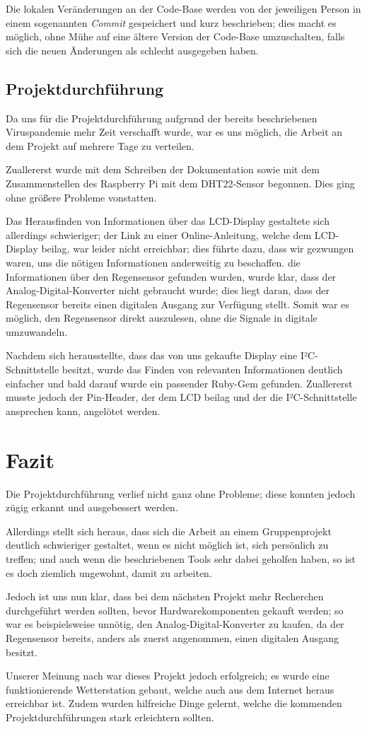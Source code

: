 \documentclass[a4paper,12pt]{article}
\begin{document}
Die lokalen Veränderungen an der Code-Base werden von der jeweiligen Person in einem sogenannten \textit{Commit} gespeichert und kurz beschrieben; dies macht es möglich, ohne Mühe auf eine ältere Version der Code-Base umzuschalten, falls sich die neuen Änderungen als schlecht ausgegeben haben.

\subsection{Projektdurchführung}
Da uns für die Projektdurchführung aufgrund der bereits beschriebenen Viruspandemie mehr Zeit verschafft wurde, war es uns möglich, die Arbeit an dem Projekt auf mehrere Tage zu verteilen. 

Zuallererst wurde mit dem Schreiben der Dokumentation sowie mit dem Zusammenstellen des Raspberry Pi mit dem DHT22-Sensor begonnen. Dies ging ohne größere Probleme vonstatten.

Das Herausfinden von Informationen über das LCD-Display gestaltete sich allerdings schwieriger; der Link zu einer Online-Anleitung, welche dem LCD-Display beilag, war leider nicht erreichbar; dies führte dazu, dass wir gezwungen waren, uns die nötigen Informationen anderweitig zu beschaffen.
die Informationen über den Regensensor gefunden wurden, wurde klar, dass der Analog-Digital-Konverter nicht gebraucht wurde; dies liegt daran, dass der Regensensor bereits einen digitalen Ausgang zur Verfügung stellt. Somit war es möglich, den Regensensor direkt auszulesen, ohne die Signale in digitale umzuwandeln.

Nachdem sich herausstellte, dass das von uns gekaufte Display eine I²C-Schnittstelle besitzt, wurde das Finden von relevanten Informationen deutlich einfacher und bald darauf wurde ein passender Ruby-Gem gefunden. Zuallererst musste jedoch der Pin-Header, der dem LCD beilag und der die I²C-Schnittstelle ansprechen kann, angelötet werden.

\pagebreak
\section{Fazit}
Die Projektdurchführung verlief nicht ganz ohne Probleme; diese konnten jedoch zügig erkannt und ausgebessert werden. 

Allerdings stellt sich heraus, dass sich die Arbeit an einem Gruppenprojekt deutlich schwieriger gestaltet, wenn es nicht möglich ist, sich persönlich zu treffen; und auch wenn die beschriebenen Tools sehr dabei geholfen haben, so ist es doch ziemlich ungewohnt, damit zu arbeiten.

Jedoch ist uns nun klar, dass bei dem nächsten Projekt mehr Recherchen durchgeführt werden sollten, bevor Hardwarekomponenten gekauft werden; so war es beispielsweise unnötig, den Analog-Digital-Konverter zu kaufen, da der Regensensor bereits, anders als zuerst angenommen, einen digitalen Ausgang besitzt.

Unserer Meinung nach war dieses Projekt jedoch erfolgreich; es wurde eine funktionierende Wetterstation gebaut, welche auch aus dem Internet heraus erreichbar ist. Zudem wurden hilfreiche Dinge gelernt, welche die kommenden Projektdurchführungen stark erleichtern sollten.
\end{document}
